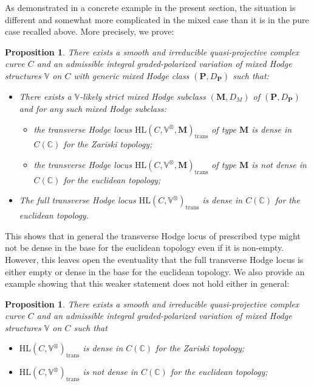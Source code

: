 \documentclass[10pt]{article}
\numberwithin{equation}{subsection}
\theoremstyle{plain}
\newtheorem{proposition}[theorem]{Proposition}
\theoremstyle{definition}
\theoremstyle{remark}
\newcommand{\C}{\mathbb C}
\newcommand{\V}{\mathbb V}
\newcommand{\pp}{\mathbf P}
\newcommand{\M}{\mathbf M}
\newcommand{\trans}{\mathrm{trans}}
\begin{document}
As demonstrated in a concrete example in the present section, the situation is different and somewhat more complicated in the mixed case than it is in the pure case recalled above. More precisely, we prove:
\begin{proposition}\label{contrexc}
There exists a smooth and irreducible quasi-projective complex curve $C$ and an admissible integral graded-polarized variation of mixed Hodge structures $\V$ on $C$ with generic mixed Hodge class $(\pp,D_\pp)$ such that:
\begin{itemize}
 \item[(i)] There exists a $\V$-likely strict mixed Hodge subclass $(\M,D_M)$ of $(\pp, D_\pp)$ and for any such mixed Hodge subclass:
\begin{itemize}
\item[($i_1)$] the transverse Hodge locus $\mathrm{HL}(C, \V^\otimes, \M)_\trans$ of type $\M$ is dense in $C(\C)$ for the Zariski topology;
\item[$(i_2)$] the transverse Hodge locus $\mathrm{HL}(C, \V^\otimes, \M)_\trans$ of type $\M$ is not dense in $C(\C)$ for the euclidean topology;
\end{itemize}
\item[(ii)] The full transverse Hodge locus $\mathrm{HL}(C, \V^\otimes)_\trans$ is dense in $C(\C)$ for the euclidean topology.
\end{itemize}
\end{proposition}
This shows that in general the transverse Hodge locus of prescribed type might not be dense in the base for the euclidean topology even if it is non-empty. However, this leaves open the eventuality that the full transverse Hodge locus is either empty or dense in the base for the euclidean topology. We also provide an example showing that this weaker statement does not hold either in general:
\begin{proposition}\label{contrexc1}
There exists a smooth and irreducible quasi-projective complex curve $C$ and an admissible integral graded-polarized variation of mixed Hodge structures $\V$ on $C$ such that 
\begin{itemize}
\item[(i)] $\mathrm{HL}(C, \V^\otimes)_\trans$ is dense in $C(\C)$ for the Zariski topology;
\item[(ii)] $\mathrm{HL}(C, \V^\otimes)_\trans$ is not dense in $C(\C)$ for the euclidean topology;
\end{itemize}
\end{proposition}
\end{document}
